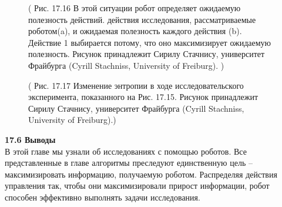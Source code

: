\documentclass[10pt,a4paper]{article}
\begin{document}
\begin{figure}[H]
	\caption{ ( Рис. 17.16 В этой ситуации робот определяет ожидаемую полезность действий.  действия исследования, рассматриваемые роботом(a), и  ожидаемая полезность каждого действия (b). Действие 1 выбирается потому, что оно максимизирует ожидаемую полезность. Рисунок принадлежит Сирилу Стачнису, университет Фрайбурга (Cyrill Stachniss, University of Freiburg). ) }
	\label{fig:1716orig}
\end{figure}

\begin{figure}[H]
	\caption{ ( Рис. 17.17 Изменение энтропии в ходе исследовательского эксперимента, показанного на Рис. 17.15. Рисунок принадлежит Сирилу Стачнису, университет Фрайбурга (Cyrill Stachniss, University of Freiburg).) }
	\label{fig:1717orig}
\end{figure}

\textbf{17.6	Выводы}\\

В этой главе мы узнали об исследованиях с помощью роботов. Все представленные в главе алгоритмы преследуют единственную цель – максимизировать информацию, получаемую роботом. Распределяя действия управления так, чтобы они максимизировали прирост информации, робот способен эффективно выполнять задачи исследования.
\end{document}
